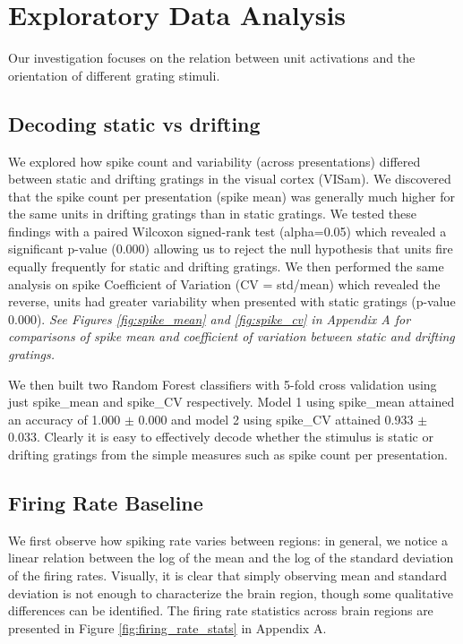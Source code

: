 \documentclass[10pt,twocolumn]{article}
\begin{document}
\section{Exploratory Data Analysis}

Our investigation focuses on the relation between unit activations and the orientation of different grating stimuli.

\subsection{Decoding static vs drifting}

We explored how spike count and variability (across presentations) differed between static and drifting gratings in the visual cortex (VISam). We discovered that the spike count per presentation (spike mean) was generally much higher for the same units in drifting gratings than in static gratings. We tested these findings with a paired Wilcoxon signed-rank test (alpha=0.05) which revealed a significant p-value (0.000) allowing us to reject the null hypothesis that units fire equally frequently for static and drifting gratings. We then performed the same analysis on spike Coefficient of Variation (CV = std/mean) which revealed the reverse, units had greater variability when presented with static gratings (p-value 0.000). \textit{See Figures \ref{fig:spike_mean} and \ref{fig:spike_cv} in Appendix A for comparisons of spike mean and coefficient of variation between static and drifting gratings.}

We then built two Random Forest classifiers with 5-fold cross validation using just spike\_mean and spike\_CV respectively. Model 1 using spike\_mean attained an accuracy of 1.000 $\pm$ 0.000 and model 2 using spike\_CV attained 0.933 $\pm$ 0.033. Clearly it is easy to effectively decode whether the stimulus is static or drifting gratings from the simple measures such as spike count per presentation.

\subsection{Firing Rate Baseline}

We first observe how spiking rate varies between regions: in general, we notice a linear relation between the log of the mean and the log of the standard deviation of the firing rates. Visually, it is clear that simply observing mean and standard deviation is not enough to characterize the brain region, though some qualitative differences can be identified. The firing rate statistics across brain regions are presented in Figure \ref{fig:firing_rate_stats} in Appendix A.
\end{document}
